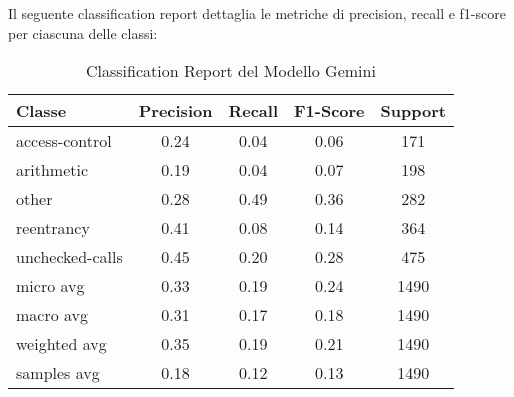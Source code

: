 \documentclass[../../Thesis.tex]{subfiles}
\begin{document}
Il seguente classification report dettaglia le metriche di precision, recall e f1-score per ciascuna delle classi:

\begin{table}[h!]
    \centering
    \begin{tabular}{|l|c|c|c|c|}
        \hline
        \textbf{Classe} & \textbf{Precision} & \textbf{Recall} & \textbf{F1-Score} & \textbf{Support} \\
        \hline
        access-control & 0.24 & 0.04 & 0.06 & 171 \\
        arithmetic & 0.19 & 0.04 & 0.07 & 198 \\
        other & 0.28 & 0.49 & 0.36 & 282 \\
        reentrancy & 0.41 & 0.08 & 0.14 & 364 \\
        unchecked-calls & 0.45 & 0.20 & 0.28 & 475 \\
        \hline
        micro avg & 0.33 & 0.19 & 0.24 & 1490 \\
        macro avg & 0.31 & 0.17 & 0.18 & 1490 \\
        weighted avg & 0.35 & 0.19 & 0.21 & 1490 \\
        samples avg & 0.18 & 0.12 & 0.13 & 1490 \\
        \hline
    \end{tabular}
    \caption{Classification Report del Modello Gemini}
\end{table}
\end{document}
